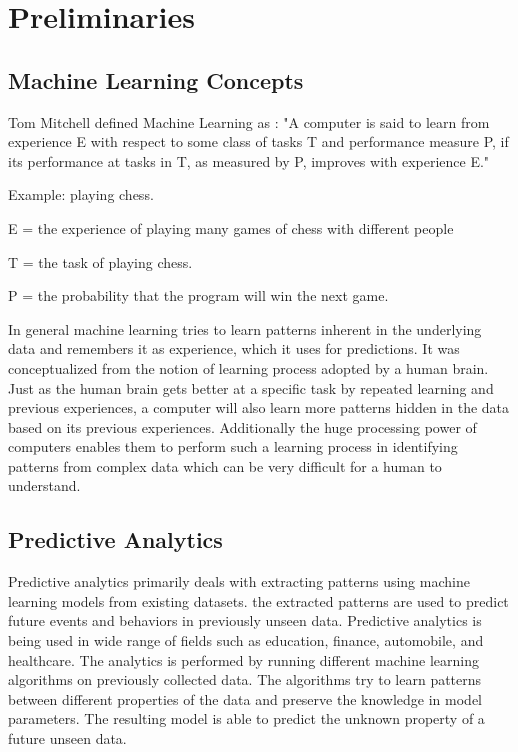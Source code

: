 \documentclass[11pt,openright]{report}
\begin{document}
\section{Preliminaries}\label{section:preliminaries}

\subsection{Machine Learning Concepts}

\noindent  Tom Mitchell defined Machine Learning as \cite{Mitchell1997}: 
\newline\newline
\hangindent=0.7cm "A computer is said to learn from experience E with respect to some class of tasks T and performance measure P, if its performance at tasks in T, as measured by P, improves with experience E." \newline 

\noindent Example: playing chess.

\noindent E = the experience of playing many games of chess with different people

\noindent T = the task of playing chess.

\noindent P = the probability that the program will win the next game.\newline 

\noindent In general machine learning tries to learn patterns inherent in the underlying data and remembers it as experience, which it uses for predictions. It was conceptualized from the notion of learning process adopted by a human brain. Just as the human brain gets better at a specific task by repeated learning and previous experiences, a computer will also learn more patterns hidden in the data based on its previous experiences. Additionally the huge processing power of computers enables them to perform such a learning process in identifying patterns from complex data which can be very difficult for a human to understand.

\subsection{Predictive Analytics}
Predictive analytics primarily deals with extracting patterns using machine learning models from existing datasets. the extracted patterns are used to predict future events and behaviors in previously unseen data. Predictive analytics is being used in wide range of fields such as education, finance, automobile, and healthcare. The analytics is performed by running different machine learning algorithms on previously collected data. The algorithms try to learn patterns between different properties of the data and preserve the knowledge in model parameters. The resulting model is able to predict the unknown property of a future unseen data.
\end{document}
